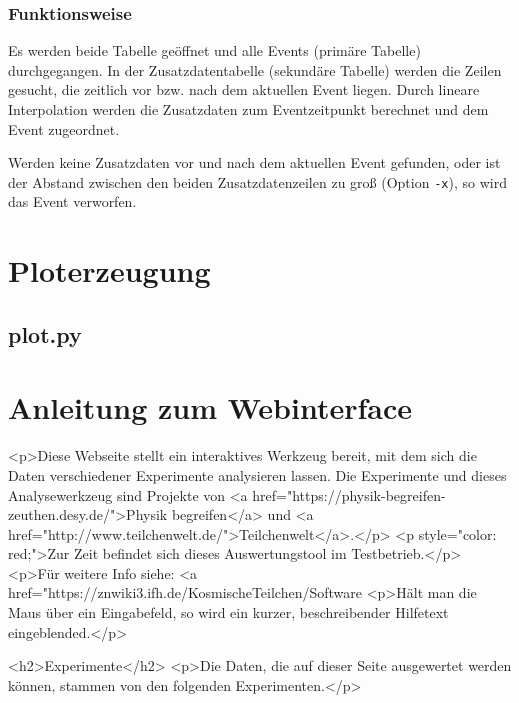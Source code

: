 \documentclass[version=last,
	a4paper,			%
	pagesize, 			%
	11pt,				%
	BCOR1cm,			%
	DIV12,	 			%
	pointlessnumbers,   %
	halfparskip,		%
]{scrreprt}
\begin{document}
\subsection{Funktionsweise}
Es werden beide Tabelle geöffnet und alle Events (primäre Tabelle) durchgegangen. In der Zusatzdatentabelle (sekundäre Tabelle) werden die Zeilen gesucht, die zeitlich vor bzw. nach dem aktuellen Event liegen. Durch lineare Interpolation werden die Zusatzdaten zum Eventzeitpunkt berechnet und dem Event zugeordnet.

Werden keine Zusatzdaten vor und nach dem aktuellen Event gefunden, oder ist der Abstand zwischen den beiden Zusatzdatenzeilen zu groß (Option \texttt{-x}), so wird das Event verworfen.










\chapter{Ploterzeugung}
\section{plot.py}

\chapter{Anleitung zum Webinterface}
			<p>Diese Webseite stellt ein interaktives Werkzeug bereit, mit dem sich die Daten verschiedener Experimente analysieren lassen.
			Die Experimente und dieses Analysewerkzeug sind Projekte von <a href="https://physik-begreifen-zeuthen.desy.de/">Physik begreifen</a> und
			<a href="http://www.teilchenwelt.de/">Teilchenwelt</a>.</p>
			<p style="color: red;">Zur Zeit befindet sich dieses Auswertungstool im Testbetrieb.</p>
			<p>Für weitere Info siehe: <a href="https://znwiki3.ifh.de/KosmischeTeilchen/Software%
			<p>Hält man die Maus über ein Eingabefeld, so wird ein kurzer, beschreibender Hilfetext eingeblended.</p>
			
			
			
			<h2>Experimente</h2>
				<p>Die Daten, die auf dieser Seite ausgewertet werden können, stammen von den folgenden Experimenten.</p>
				
\end{document}
